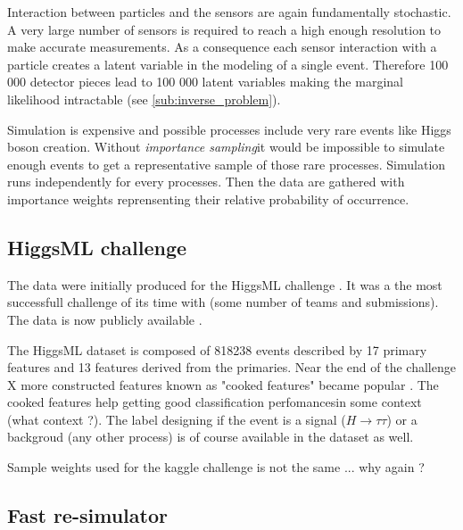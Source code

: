 Interaction between particles and the sensors are again fundamentally stochastic.
A very large number of sensors is required to reach a high enough resolution to make accurate measurements.
As a consequence each sensor interaction with a particle creates a latent variable in the modeling of a single event.
Therefore 100 000 detector pieces lead to 100 000 latent variables making the marginal likelihood intractable (see \autoref{sub:inverse_problem}).

Simulation is expensive and possible processes include very rare events like Higgs boson creation.
Without \emph{importance sampling}\needcite it would be impossible to simulate enough events to get a representative sample of those rare processes.
Simulation runs independently for every processes.
Then the data are gathered with importance weights reprensenting their relative probability of occurrence.








\subsection{HiggsML challenge} %
\label{sub:higgsml_challenge}


The data were initially produced for the HiggsML challenge \cite{Adam-Bourdarios2014}.
It was a the most successfull challenge of its time with (some number of teams and submissions).
The data is now publicly available \needcite.

The HiggsML dataset is composed of 818238 events described by 17 primary features and 13 features derived from the primaries.
Near the end of the challenge X more constructed features known as "cooked features" became popular \needcite.
The cooked features help getting good classification perfomances\needcite in some context (what context ?).
The label designing if the event is a signal ($H\to \tau \tau$) or a backgroud (any other process) is of course available in the dataset as well.

Sample weights used for the kaggle challenge is not the same ... why again ?







\subsection{Fast re-simulator} %
\label{sub:fast_re_simulator}


